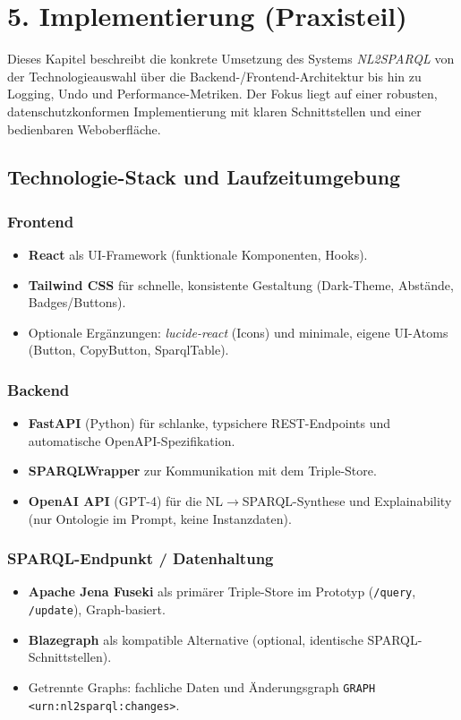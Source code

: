 \chapter{5. Implementierung (Praxisteil)}
\label{sec:implementierung}

Dieses Kapitel beschreibt die konkrete Umsetzung des Systems \emph{NL2SPARQL} von der Technologieauswahl über die Backend-/Frontend-Architektur bis hin zu Logging, Undo und Performance-Metriken. Der Fokus liegt auf einer robusten, datenschutzkonformen Implementierung mit klaren Schnittstellen und einer bedienbaren Weboberfläche.

\section{Technologie-Stack und Laufzeitumgebung}
\subsection*{Frontend}
\begin{itemize}
  \item \textbf{React} als UI-Framework (funktionale Komponenten, Hooks).
  \item \textbf{Tailwind CSS} für schnelle, konsistente Gestaltung (Dark-Theme, Abstände, Badges/Buttons).
  \item Optionale Ergänzungen: \emph{lucide-react} (Icons) und minimale, eigene UI-Atoms (Button, CopyButton, SparqlTable).
\end{itemize}

\subsection*{Backend}
\begin{itemize}
  \item \textbf{FastAPI} (Python) für schlanke, typsichere REST-Endpoints und automatische OpenAPI-Spezifikation.
  \item \textbf{SPARQLWrapper} zur Kommunikation mit dem Triple-Store.
  \item \textbf{OpenAI API} (GPT-4) für die NL$\rightarrow$SPARQL-Synthese und Explainability (nur Ontologie im Prompt, keine Instanzdaten).
\end{itemize}

\subsection*{SPARQL-Endpunkt / Datenhaltung}
\begin{itemize}
  \item \textbf{Apache Jena Fuseki} als primärer Triple-Store im Prototyp (\texttt{/query}, \texttt{/update}), Graph-basiert.
  \item \textbf{Blazegraph} als kompatible Alternative (optional, identische SPARQL-Schnittstellen).
  \item Getrennte Graphs: fachliche Daten und Änderungsgraph \texttt{GRAPH <urn:nl2sparql:changes>}.
\end{itemize}

